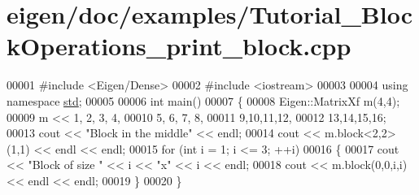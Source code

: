\hypertarget{eigen_2doc_2examples_2_tutorial___block_operations__print__block_8cpp_source}{}\section{eigen/doc/examples/\+Tutorial\+\_\+\+Block\+Operations\+\_\+print\+\_\+block.cpp}
\label{eigen_2doc_2examples_2_tutorial___block_operations__print__block_8cpp_source}

\begin{DoxyCode}
00001 \textcolor{preprocessor}{#include <Eigen/Dense>}
00002 \textcolor{preprocessor}{#include <iostream>}
00003 
00004 \textcolor{keyword}{using namespace }\hyperlink{namespacestd}{std};
00005 
00006 \textcolor{keywordtype}{int} main()
00007 \{
00008   Eigen::MatrixXf m(4,4);
00009   m <<  1, 2, 3, 4,
00010         5, 6, 7, 8,
00011         9,10,11,12,
00012        13,14,15,16;
00013   cout << \textcolor{stringliteral}{"Block in the middle"} << endl;
00014   cout << m.block<2,2>(1,1) << endl << endl;
00015   \textcolor{keywordflow}{for} (\textcolor{keywordtype}{int} i = 1; i <= 3; ++i)
00016   \{
00017     cout << \textcolor{stringliteral}{"Block of size "} << i << \textcolor{stringliteral}{"x"} << i << endl;
00018     cout << m.block(0,0,i,i) << endl << endl;
00019   \}
00020 \}
\end{DoxyCode}
